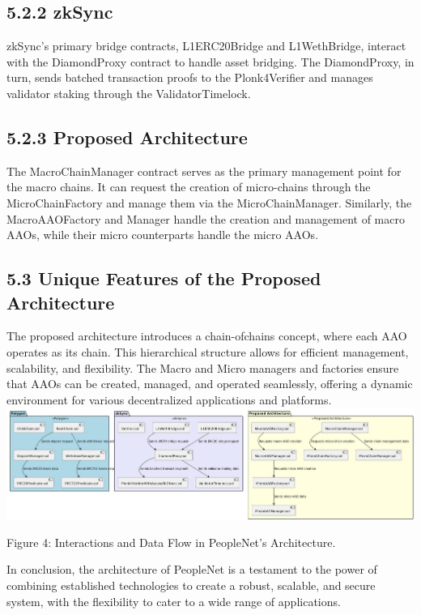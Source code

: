 \documentclass[10pt]{article}
\begin{document}
\subsection*{5.2.2 zkSync}
zkSync's primary bridge contracts, L1ERC20Bridge and L1WethBridge, interact with the DiamondProxy contract to handle asset bridging. The DiamondProxy, in turn, sends batched transaction proofs to the Plonk4Verifier and manages validator staking through the ValidatorTimelock.

\subsection*{5.2.3 Proposed Architecture}
The MacroChainManager contract serves as the primary management point for the macro chains. It can request the creation of micro-chains through the MicroChainFactory and manage them via the MicroChainManager. Similarly, the MacroAAOFactory and Manager handle the creation and management of macro AAOs, while their micro counterparts handle the micro AAOs.

\subsection*{5.3 Unique Features of the Proposed Architecture}
The proposed architecture introduces a chain-ofchains concept, where each AAO operates as its chain. This hierarchical structure allows for efficient management, scalability, and flexibility. The Macro and Micro managers and factories ensure that AAOs can be created, managed, and operated seamlessly, offering a dynamic environment for various decentralized applications and platforms.\\
\includegraphics[max width=\textwidth, center]{2025_03_06_545dea0014012947d15fg-05(1)}

Figure 4: Interactions and Data Flow in PeopleNet's Architecture.

In conclusion, the architecture of PeopleNet is a testament to the power of combining established technologies to create a robust, scalable, and secure system, with the flexibility to cater to a wide range of applications.
\end{document}

